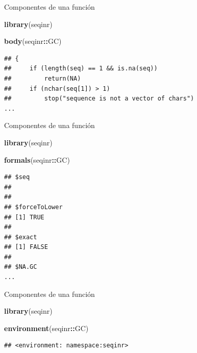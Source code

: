\documentclass[ignorenonframetext,]{beamer}
\newenvironment{Shaded}{\begin{snugshade}}{\end{snugshade}}
\newcommand{\KeywordTok}[1]{\textcolor[rgb]{0.13,0.29,0.53}{\textbf{#1}}}
\newcommand{\NormalTok}[1]{#1}
\newcommand{\OperatorTok}[1]{\textcolor[rgb]{0.81,0.36,0.00}{\textbf{#1}}}
\begin{document}
\begin{frame}[fragile]{Componentes de una función}
\protect\hypertarget{componentes-de-una-funciuxf3n-1}{}

\begin{Shaded}
\begin{Highlighting}[]
\KeywordTok{library}\NormalTok{(seqinr)}

\KeywordTok{body}\NormalTok{(seqinr}\OperatorTok{::}\NormalTok{GC)}
\end{Highlighting}
\end{Shaded}

\begin{verbatim}
## {
##     if (length(seq) == 1 && is.na(seq)) 
##         return(NA)
##     if (nchar(seq[1]) > 1) 
##         stop("sequence is not a vector of chars")
...
\end{verbatim}

\end{frame}

\begin{frame}[fragile]{Componentes de una función}
\protect\hypertarget{componentes-de-una-funciuxf3n-2}{}

\begin{Shaded}
\begin{Highlighting}[]
\KeywordTok{library}\NormalTok{(seqinr)}

\KeywordTok{formals}\NormalTok{(seqinr}\OperatorTok{::}\NormalTok{GC)}
\end{Highlighting}
\end{Shaded}

\begin{verbatim}
## $seq
## 
## 
## $forceToLower
## [1] TRUE
## 
## $exact
## [1] FALSE
## 
## $NA.GC
...
\end{verbatim}

\end{frame}

\begin{frame}[fragile]{Componentes de una función}
\protect\hypertarget{componentes-de-una-funciuxf3n-3}{}

\begin{Shaded}
\begin{Highlighting}[]
\KeywordTok{library}\NormalTok{(seqinr)}

\KeywordTok{environment}\NormalTok{(seqinr}\OperatorTok{::}\NormalTok{GC)}
\end{Highlighting}
\end{Shaded}

\begin{verbatim}
## <environment: namespace:seqinr>
\end{verbatim}

\end{frame}
\end{document}
